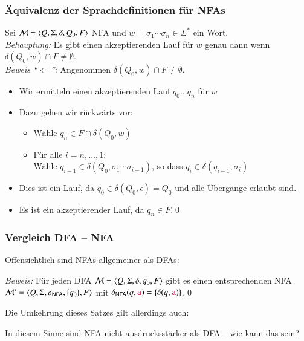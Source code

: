 \documentclass[aspectratio=1610,onlymath]{beamer}
\begin{document}
\begin{frame}[t]\frametitle{Äquivalenz der Sprachdefinitionen für NFAs}

Sei $\mathcal{M}=\langle{Q,\Sigma,\delta,Q_0,F}\rangle$ NFA und $w=\sigma_1\cdots\sigma_n\in\Sigma^*$ ein Wort.\\[1ex]

\emph{Behauptung:} Es gibt einen akzeptierenden Lauf für $w$ genau dann wenn
$\delta(Q_0,w)\cap F \neq \emptyset$.\\[1ex]

\emph{Beweis "`$\Leftarrow$"':}
Angenommen $\delta(Q_0,w)\cap F \neq \emptyset$.\pause
\begin{itemize}
\item Wir ermitteln einen akzeptierenden Lauf $q_0\ldots q_n$ für $w$\pause
\item Dazu gehen wir rückwärts vor:
\begin{itemize}
\item Wähle $q_n\in F\cap\delta(Q_0,w)$
\item Für alle $i=n,\ldots,1$:\\
Wähle $q_{i-1}\in\delta(Q_0,\sigma_1\cdots\sigma_{i-1})$, so dass $q_i\in\delta(q_{i-1},\sigma_i) $
\end{itemize}\pause
\item Dies ist ein Lauf, da $q_0\in\delta(Q_0,\epsilon)=Q_0$ und alle Übergänge erlaubt sind.
\item Es ist ein akzeptierender Lauf, da $q_n\in F$.\qed
\end{itemize}
\end{frame}



\begin{frame}\frametitle{Vergleich DFA -- NFA}

Offensichtlich sind NFAs allgemeiner als DFAs:


\emph{Beweis:} Für jeden DFA  $\mathcal{M}=\langle{Q,\Sigma,\delta,q_0,F}\rangle$ gibt es
einen entsprechenden NFA $\mathcal{M}'=\langle{Q,\Sigma,\delta_{\textsf{NFA}},\{q_0\},F}\rangle$
mit $\delta_{\textsf{NFA}}(q,\mathtt{\textcolor{purple}{a}}) = \{\delta(q,\mathtt{\textcolor{purple}{a}})\}$.\qed
\bigskip
\pause

Die Umkehrung dieses Satzes gilt allerdings auch:

In diesem Sinne sind NFA nicht ausdrucksstärker als DFA -- wie kann das sein?

\end{frame}
\end{document}
